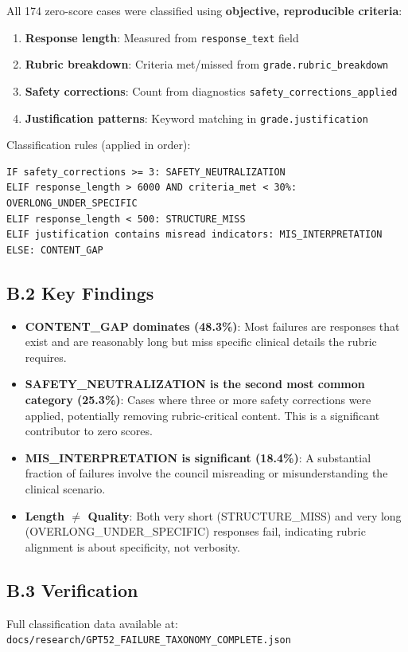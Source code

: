 All 174 zero-score cases were classified using \textbf{objective, reproducible criteria}:

\begin{enumerate}
    \item \textbf{Response length}: Measured from \texttt{response\_text} field
    \item \textbf{Rubric breakdown}: Criteria met/missed from \texttt{grade.rubric\_breakdown}
    \item \textbf{Safety corrections}: Count from diagnostics \texttt{safety\_corrections\_applied}
    \item \textbf{Justification patterns}: Keyword matching in \texttt{grade.justification}
\end{enumerate}

Classification rules (applied in order):
\begin{verbatim}
IF safety_corrections >= 3: SAFETY_NEUTRALIZATION
ELIF response_length > 6000 AND criteria_met < 30%: OVERLONG_UNDER_SPECIFIC
ELIF response_length < 500: STRUCTURE_MISS
ELIF justification contains misread indicators: MIS_INTERPRETATION
ELSE: CONTENT_GAP
\end{verbatim}

\subsection*{B.2 Key Findings}

\begin{itemize}
    \item \textbf{CONTENT\_GAP dominates (48.3\%)}: Most failures are responses that exist
    and are reasonably long but miss specific clinical details the rubric requires.

    \item \textbf{SAFETY\_NEUTRALIZATION is the second most common category (25.3\%)}:
    Cases where three or more safety corrections were applied, potentially removing
    rubric-critical content. This is a significant contributor to zero scores.

    \item \textbf{MIS\_INTERPRETATION is significant (18.4\%)}: A substantial fraction
    of failures involve the council misreading or misunderstanding the clinical scenario.
    
    \item \textbf{Length $\neq$ Quality}: Both very short (STRUCTURE\_MISS) and very long
    (OVERLONG\_UNDER\_SPECIFIC) responses fail, indicating rubric alignment is about
    specificity, not verbosity.
\end{itemize}

\subsection*{B.3 Verification}

Full classification data available at: \texttt{docs/research/GPT52\_FAILURE\_TAXONOMY\_COMPLETE.json}

